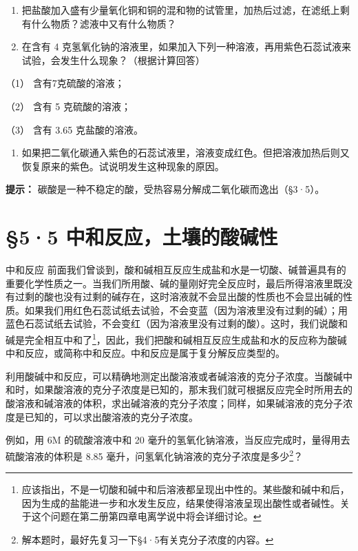 \begin{enumerate}[start=3]
\item
  把盐酸加入盛有少量氧化铜和铜的混和物的试管里，加热后过滤，在滤纸上剩有什么物质？滤液中又有什么物质？
\item
  在含有 4
  克氢氧化钠的溶液里，如果加入下列一种溶液，再用紫色石蕊试液来试验，会发生什么现象？（根据计算回答）
\end{enumerate}

（1） 含有7克硫酸的溶液；

（2） 含有 5 克硫酸的溶液；

（3） 含有 3.65 克盐酸的溶液。

\begin{enumerate}[start=5]
\item
  如果把二氧化碳通入紫色的石蕊试液里，溶液变成红色。但把溶液加热后则又恢复原来的紫色。试说明发生这种现象的原因。
\end{enumerate}

\begin{shulihuadef}
\textbf{提示：}
碳酸是一种不稳定的酸，受热容易分解成二氧化碳而逸出（§3·5）。
\end{shulihuadef}

\section{§5·5 中和反应，土壤的酸碱性}

中和反应
前面我们曾谈到，酸和碱相互反应生成盐和水是一切酸、碱普遍具有的重要化学性质之一。当我们所用酸、碱的量刚好完全反应时，最后所得溶液里既没有过剩的酸也没有过剩的碱存在，这时溶液就不会显出酸的性质也不会显出碱的性质。如果我们用红色石蕊试纸去试验，不会变蓝（因为溶液里没有过剩的碱）；用蓝色石蕊试纸去试验，不会变红（因为溶液里没有过剩的酸）。这时，我们说酸和碱是完全相互中和了\footnote{应该指出，不是一切酸和碱中和后溶液都呈现出中性的。某些酸和碱中和后，因为生成的盐能进一步和水发生反应，结果使得溶液呈现出酸性或者碱性。关于这个问题在第二册第四章电离学说中将会详细讨论。}，因此，我们把酸和碱相互反应生成盐和水的反应称为酸碱中和反应，或简称中和反应。中和反应是属于复分解反应类型的。

利用酸碱中和反应，可以精确地测定出酸溶液或者碱溶液的克分子浓度。当酸碱中和时，如果酸溶液的克分子浓度是已知的，那末我们就可根据反应完全时所用去的酸溶液和碱溶液的体积，求出碱溶液的克分子浓度；同样，如果碱溶液的克分子浓度是已知的，可以求出酸溶液的克分子浓度。

例如，用 6M 的硫酸溶液中和 20
毫升的氢氧化钠溶液，当反应完成时，量得用去硫酸溶液的体积是 8.85
毫升，问氢氧化钠溶液的克分子浓度是多少\footnote{解本题时，最好先复习一下§4·5有关克分子浓度的内容。}？

